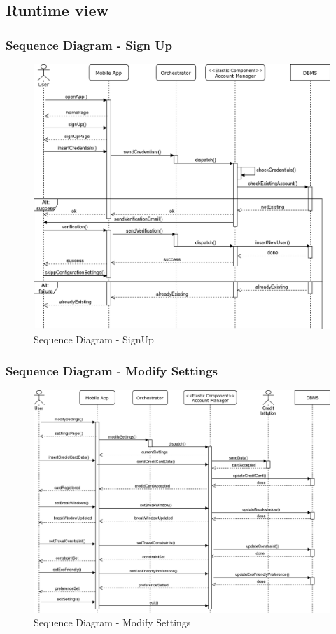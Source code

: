 \subsection{Runtime view}
	\label{sect:RuntimeView}
	\subsubsection{Sequence Diagram - Sign Up}
	\label{sect:sd_signUp}
	\begin{figure}[H]
		\centerline{\includegraphics[width=0.9\paperwidth]{Images/signUp}}
		\caption{Sequence Diagram - SignUp}
	\end{figure}
	
	\subsubsection{Sequence Diagram - Modify Settings}
	\begin{figure}[H]
		\centerline{\includegraphics[width=0.9\paperwidth]{Images/ModifySettings}}
		\caption{Sequence Diagram - Modify Settings}
	\end{figure}

